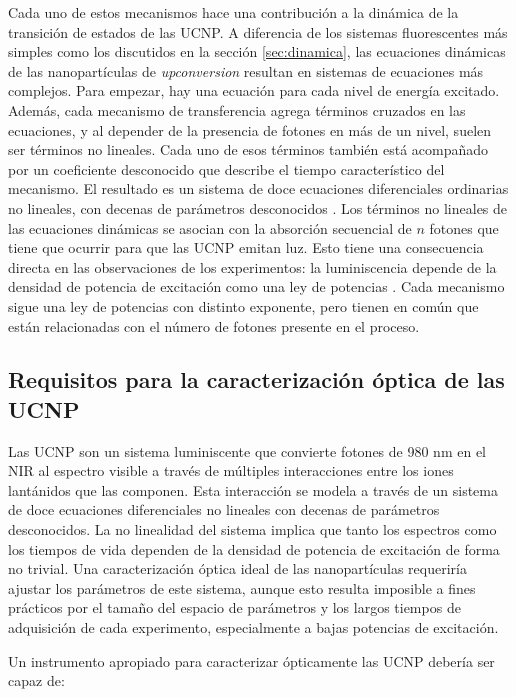 Cada uno de estos mecanismos hace una contribución a la dinámica de la transición de estados de las UCNP.
A diferencia de los sistemas fluorescentes más simples como los discutidos en la sección \ref{sec:dinamica}, las ecuaciones dinámicas de las nanopartículas de \textit{upconversion} resultan en sistemas de ecuaciones más complejos.
Para empezar, hay una ecuación para cada nivel de energía excitado.
Además, cada mecanismo de transferencia agrega términos cruzados en las ecuaciones, y al depender de la presencia de fotones en más de un nivel, suelen ser términos no lineales.
Cada uno de esos términos también está acompañado por un coeficiente desconocido que describe el tiempo característico del mecanismo.
El resultado es un sistema de doce ecuaciones diferenciales ordinarias no lineales, con decenas de parámetros desconocidos \cite{anderson_revisiting_2014}.
Los términos no lineales de las ecuaciones dinámicas se asocian con la absorción secuencial de $n$ fotones que tiene que ocurrir para que las UCNP emitan luz.
Esto tiene una consecuencia directa en las observaciones de los experimentos: la luminiscencia depende de la densidad de potencia de excitación como una ley de potencias \cite{pollnau2000}.
Cada mecanismo sigue una ley de potencias con distinto exponente, pero tienen en común que están relacionadas con el número de fotones presente en el proceso.

\subsection{Requisitos para la caracterización óptica de las UCNP}

Las UCNP son un sistema luminiscente que convierte fotones de 980 nm en el NIR al espectro visible a través de múltiples interacciones entre los iones lantánidos que las componen.
Esta interacción se modela a través de un sistema de doce ecuaciones diferenciales no lineales con decenas de parámetros desconocidos.
La no linealidad del sistema implica que tanto los espectros como los tiempos de vida dependen de la densidad de potencia de excitación de forma no trivial.
Una caracterización óptica ideal de las nanopartículas requeriría ajustar los parámetros de este sistema, aunque esto resulta imposible a fines prácticos por el tamaño del espacio de parámetros y los largos tiempos de adquisición de cada experimento, especialmente a bajas potencias de excitación.

Un instrumento apropiado para caracterizar ópticamente las UCNP debería ser capaz de:

